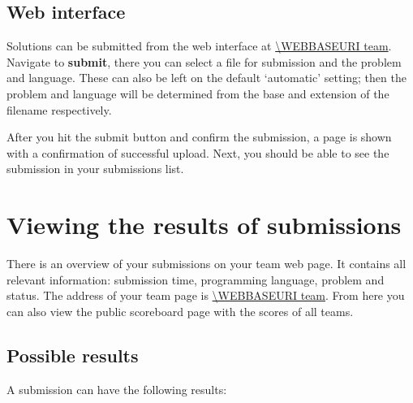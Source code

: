\subsection{Web interface}

Solutions can be submitted from the web interface at \url{\WEBBASEURI team}.
Navigate to \textbf{submit}, there you can select a file for
submission and the problem and language. These can also be left on the
default `automatic' setting; then the problem and language will be
determined from the base and extension of the filename respectively.

After you hit the submit button and confirm the submission, a page is
shown with a confirmation of successful upload. Next, you should be
able to see the submission in your submissions list.

\section{Viewing the results of submissions}

There is an overview of your submissions on your team web page.
It contains all relevant information: submission time, programming
language, problem and status. The address of your team page is
\url{\WEBBASEURI team}. From here you can also view the public
scoreboard page with the scores of all teams.

\subsection{Possible results}

A submission can have the following results:

